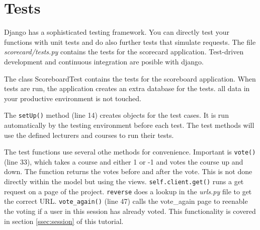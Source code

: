 \section{Tests}

Django has a sophisticated testing framework. You can directly test your functions with unit tests and do also further tests that simulate requests. The file \emph{scorecard/tests.py} contains the tests for the scorecard application. Test-driven development and continuous integration are posible with django.

The class ScoreboardTest contains the tests for the scoreboard application. When tests are run, the application creates an extra database for the tests. all data in your productive environment is not touched.

The \lstinline|setUp()| method (line 14) creates objects for the test cases. It is run automatically by the testing environment before each test. The test methods will use the defined lecturers and courses to run their tests.

The test functions use several othe methods for convenience. Important is \lstinline|vote()| (line 33), which takes a course and either 1 or -1 and votes the course up and down. The function returns the votes before and after the vote. This is not done directly within the model but using the views. \lstinline|self.client.get()| runs a get request on a page of the project. \lstinline|reverse| does a lookup in the \emph{urls.py} file to get the correct URL. \lstinline|vote_again()| (line 47) calls the vote\_again page to reenable the voting if a user in this session has already voted. This functionality is covered in section \ref{ssec:session} of this tutorial.

